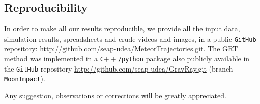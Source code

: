 \documentclass[fleqn,usenatbib]{mnras}
\begin{document}
\subsection{Reproducibility}

In order to make all our results reproducible, we provide all the input data, simulation results, spreadsheets and crude videos and images, in a public {\tt GitHub} repository: \url{http://github.com/seap-udea/MeteorTrajectories.git}.  The GRT method was implemented in a {\tt C$++$/python} package  also publicly available in the {\tt GitHub} repository \url{http://github.com/seap-udea/GravRay.git} (branch {\tt MoonImpact}).

Any suggestion, observations or corrections will be greatly appreciated.

\bsp
\label{lastpage}
\end{document}
